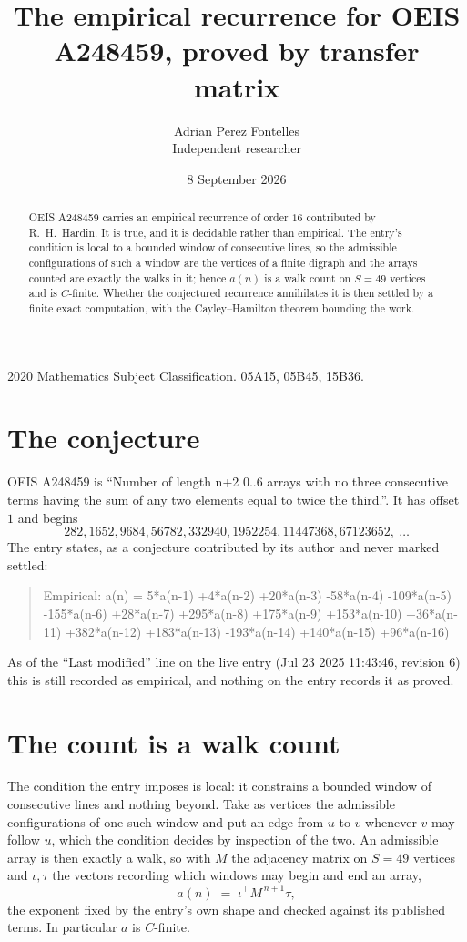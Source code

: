 \documentclass[11pt,a4paper]{article}
\title{The empirical recurrence for OEIS A248459, proved by transfer matrix}
\author{Adrian Perez Fontelles\\ \small Independent researcher}
\date{8 September 2026}
\theoremstyle{plain}
\theoremstyle{definition}
\begin{document}
\maketitle

\begin{abstract}
OEIS A248459 carries an empirical recurrence of order $16$ contributed by R.~H.~Hardin. It is
true, and it is decidable rather than empirical. The entry's condition is local to a bounded window of consecutive lines, so
the admissible configurations of such a window are the vertices of a finite digraph and the
arrays counted are exactly the walks in it; hence $a(n)$ is a walk count on $S=49$ vertices
and is $C$-finite. Whether the conjectured recurrence annihilates it is then settled by a
finite exact computation, with the Cayley--Hamilton theorem bounding the work.
\end{abstract}

\noindent\small 2020 Mathematics Subject Classification. 05A15, 05B45, 15B36.\normalsize

\section{The conjecture}

OEIS A248459 is ``Number of length n+2 0..6 arrays with no three consecutive terms having the sum of any two elements equal to twice the third.''. It has offset $1$ and begins
\[
282, 1652, 9684, 56782, 332940, 1952254, 11447368, 67123652,\ \dots
\]
The entry states, as a conjecture contributed by its author and never marked settled:
\begin{quote}
Empirical: a(n) = 5*a(n-1) +4*a(n-2) +20*a(n-3) -58*a(n-4) -109*a(n-5) -155*a(n-6) +28*a(n-7) +295*a(n-8) +175*a(n-9) +153*a(n-10) +36*a(n-11) +382*a(n-12) +183*a(n-13) -193*a(n-14) +140*a(n-15) +96*a(n-16)
\end{quote}
As of the ``Last modified'' line on the live entry (Jul 23 2025 11:43:46, revision 6) this is still
recorded as empirical, and nothing on the entry records it as proved.

\section{The count is a walk count}

The condition the entry imposes is local: it constrains a bounded window of consecutive lines and nothing beyond. Take as
vertices the admissible configurations of one such window and put an edge from $u$ to $v$
whenever $v$ may follow $u$, which the condition decides by inspection of the two. An
admissible array is then exactly a walk, so with $M$ the adjacency matrix on $S=49$ vertices
and $\iota,\tau$ the vectors recording which windows may begin and end an array,
\[
a(n)\;=\;\iota^{\!\top}M^{\,n+1}\tau ,
\]
the exponent fixed by the entry's own shape and checked against its published terms. In
particular $a$ is $C$-finite.
\end{document}
